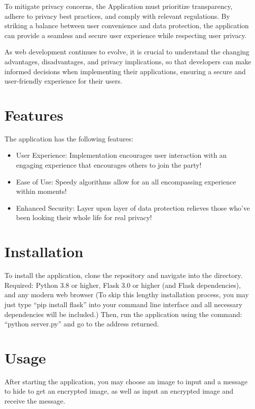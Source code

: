 \documentclass[conference]{IEEEtran}
\begin{document}
To mitigate privacy concerns, the Application must prioritize transparency, adhere to privacy best practices, and comply with relevant regulations. By striking a balance between user convenience and data protection, the application can provide a seamless and secure user experience while respecting user privacy.

As web development continues to evolve, it is crucial to understand the changing advantages, disadvantages, and privacy implications, so that developers can make informed decisions when implementing their applications, ensuring a secure and user-friendly experience for their users.


\section{Features}
The application has the following features:
\begin{itemize}
\item User Experience: Implementation encourages user interaction with an engaging experience that encourages others to join the party!
\item Ease of Use: Speedy algorithms allow for an all encompassing experience within moments!
\item Enhanced Security: Layer upon layer of data protection relieves those who’ve been looking their whole life for real privacy!
\end{itemize}


\section{Installation}
To install the application, clone the repository and navigate into the directory.
Required: Python 3.8 or higher, Flask 3.0 or higher (and Flask dependencies), and any modern web browser
(To skip this lengthy installation process, you may just type “pip install flask” into your command line interface and all necessary dependencies will be included.)
Then, run the application using the command: “python server.py” and go to the address returned.


\section{Usage}
After starting the application, you may choose an image to input and a message to hide to get an encrypted image, as well as input an encrypted image and receive the message.
\end{document}
